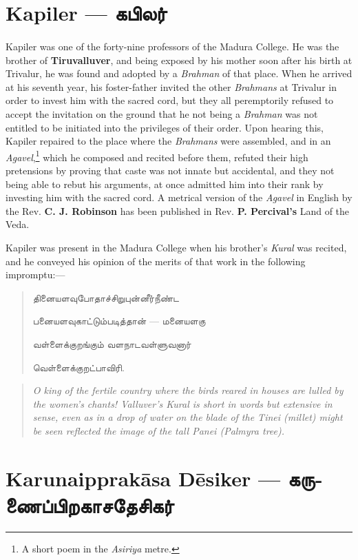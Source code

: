 \documentclass{article}
\newcommand{\TamilText}[1]{\texttamil{#1}}
\newcommand{\TamilBold}[1]{\texttamil{\textbf{#1}}}
\newcommand{\tam}[1]{\TamilText{#1}}
\newcommand{\tambold}[1]{\TamilBold{#1}}
\begin{document}
\section{Kapiler --- \tambold{கபிலர்}}
\paragraph{}
Kapiler was one of the forty-nine professors of the Madura College. He was the brother of \textbf{Tiruvalluver}, and being exposed by his mother soon after his birth at Trivalur, he was found and adopted by a \emph{Brahman} of that place. When he arrived at his seventh year, his foster-father invited the other \emph{Brahmans} at Trivalur in order to invest him with the sacred cord, but they all peremptorily refused to accept the invitation on the ground that he not being a \emph{Brahman} was not entitled to be initiated into the privileges of their order. Upon hearing this, Kapiler repaired to the place where the \emph{Brahmans} were assembled, and in an \emph{Agavel},\footnote{A short poem in the \emph{Asiriya} metre.} which he composed and recited before them, refuted their high pretensions by proving that caste was not innate but accidental, and they not being able to rebut his arguments, at once admitted him into their rank by investing him with the sacred cord. A metrical version of the \emph{Agavel} in English by the Rev. \textbf{C. J. Robinson} has been published in Rev. \textbf{P. Percival's} Land of the Veda.

Kapiler was present in the Madura College when his brother's \emph{Kural} was recited, and he conveyed his opinion of the merits of that work in the following impromptu:---
\begin{quotation}\small
\tam{தினையளவுபோதாச்சிறுபுன்னீர்நீண்ட}

\tam{பனையளவுகாட்டும்படித்தான்} --- \tam{மனையளகு}

\tam{வள்ளைக்குறங்கும்‌ வளநாடவள்ளுவனார்}

\tam{வெள்ளைக்குறட்பாவிரி}.
\end{quotation}
\begin{quotation}\small
\emph{O king of the fertile country where the birds reared in houses are lulled by the women's chants! Valluver's Kural is short in words but extensive in sense, even as in a drop of water on the blade of the Tinei (millet) might be seen reflected the image of the tall Panei (Palmyra tree).}
\end{quotation}

\section{Karunaipprak\={a}sa D\={e}siker --- \tambold{கருணைப்பிறகாசதேசிகர்}}
\end{document}
